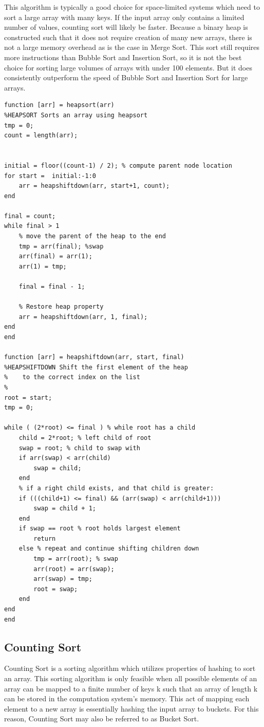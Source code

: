 \documentclass[a4paper]{article}
\begin{document}
This algorithm is typically a good choice for space-limited systems which need to sort a large array with many keys. If the input array only contains a limited number of values, counting sort will likely be faster. Because a binary heap is constructed such that it does not require creation of many new arrays, there is not a large memory overhead as is the case in Merge Sort. This sort still requires more instructions than Bubble Sort and Insertion Sort, so it is not the best choice for sorting large volumes of arrays with under 100 elements. But it does consistently outperform the speed of Bubble Sort and Insertion Sort for large arrays.

\begin{lstlisting}
function [arr] = heapsort(arr)
%HEAPSORT Sorts an array using heapsort
tmp = 0;
count = length(arr);


initial = floor((count-1) / 2); % compute parent node location
for start =  initial:-1:0
    arr = heapshiftdown(arr, start+1, count);
end

final = count;
while final > 1
    % move the parent of the heap to the end
    tmp = arr(final); %swap
    arr(final) = arr(1);
    arr(1) = tmp;
 
    final = final - 1;
    
    % Restore heap property
    arr = heapshiftdown(arr, 1, final);
end
end

function [arr] = heapshiftdown(arr, start, final)
%HEAPSHIFTDOWN Shift the first element of the heap 
%    to the correct index on the list
%   
root = start;
tmp = 0;

while ( (2*root) <= final ) % while root has a child
    child = 2*root; % left child of root
    swap = root; % child to swap with
    if arr(swap) < arr(child)
        swap = child;
    end
    % if a right child exists, and that child is greater:
    if (((child+1) <= final) && (arr(swap) < arr(child+1)))
        swap = child + 1;
    end
    if swap == root % root holds largest element
        return
    else % repeat and continue shifting children down
        tmp = arr(root); % swap
        arr(root) = arr(swap);
        arr(swap) = tmp;
        root = swap;
    end
end
end
\end{lstlisting}


\subsection{Counting Sort}
Counting Sort is a sorting algorithm which utilizes properties of hashing to sort an array. This sorting algorithm is only feasible when all possible elements of an array can be mapped to a finite number of keys k such that an array of length k can be stored in the computation system’s memory. This act of mapping each element to a new array is essentially hashing the input array to buckets. For this reason, Counting Sort may also be referred to as Bucket Sort.
\end{document}
